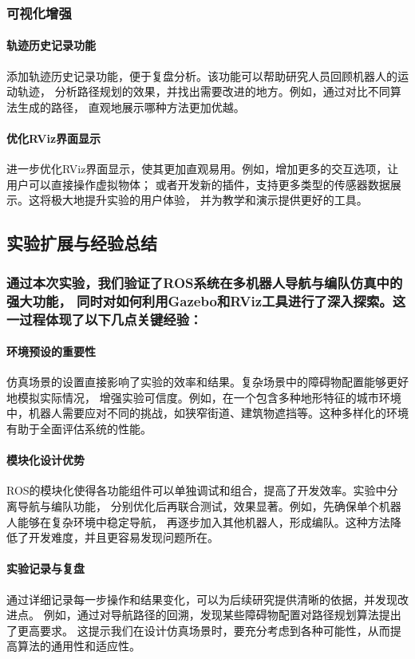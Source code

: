 \documentclass[journal,twoside,web]{ieeecolor}
\begin{document}
\subsubsection*{可视化增强}
\paragraph{轨迹历史记录功能}
添加轨迹历史记录功能，便于复盘分析。该功能可以帮助研究人员回顾机器人的运动轨迹，
分析路径规划的效果，并找出需要改进的地方。例如，通过对比不同算法生成的路径，
直观地展示哪种方法更加优越。
 
\paragraph{优化RViz界面显示}
进一步优化RViz界面显示，使其更加直观易用。例如，增加更多的交互选项，让用户可以直接操作虚拟物体；
或者开发新的插件，支持更多类型的传感器数据展示。这将极大地提升实验的用户体验，
并为教学和演示提供更好的工具。
 
\subsection*{实验扩展与经验总结}
 
\subsubsection*{通过本次实验，我们验证了ROS系统在多机器人导航与编队仿真中的强大功能，
同时对如何利用Gazebo和RViz工具进行了深入探索。这一过程体现了以下几点关键经验：}
 
\paragraph{环境预设的重要性}
仿真场景的设置直接影响了实验的效率和结果。复杂场景中的障碍物配置能够更好地模拟实际情况，
增强实验可信度。例如，在一个包含多种地形特征的城市环境中，机器人需要应对不同的挑战，如狭窄街道、建筑物遮挡等。这种多样化的环境有助于全面评估系统的性能。
 
\paragraph{模块化设计优势}
ROS的模块化使得各功能组件可以单独调试和组合，提高了开发效率。实验中分离导航与编队功能，
分别优化后再联合测试，效果显著。例如，先确保单个机器人能够在复杂环境中稳定导航，
再逐步加入其他机器人，形成编队。这种方法降低了开发难度，并且更容易发现问题所在。
 
\paragraph{实验记录与复盘}
通过详细记录每一步操作和结果变化，可以为后续研究提供清晰的依据，并发现改进点。
例如，通过对导航路径的回溯，发现某些障碍物配置对路径规划算法提出了更高要求。
这提示我们在设计仿真场景时，要充分考虑到各种可能性，从而提高算法的通用性和适应性。
 
\end{document}

